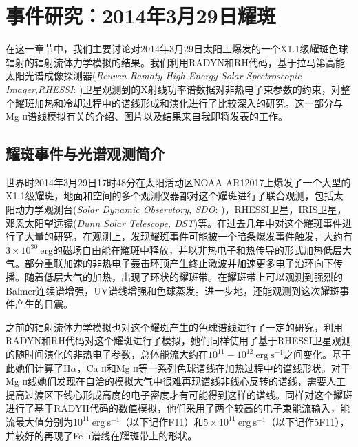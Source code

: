 
\chapter{事件研究：2014年3月29日耀斑}\label{chap:3}
在这一章节中，我们主要讨论对2014年3月29日太阳上爆发的一个X1.1级耀斑色球辐射的辐射流体力学模拟的结果。我们利用RADYN和RH代码，基于拉马第高能太阳光谱成像探测器(\textit{Reuven Ramaty High Energy Solar Spectroscopic Imager,RHESSI}: \cites{Lin2002})卫星观测到的X射线功率谱数据对非热电子束参数的约束，对整个耀斑加热和冷却过程中的谱线形成和演化进行了比较深入的研究。这一部分与Mg \textsc{ii}谱线模拟有关的介绍、图片以及结果来自我即将发表的工作\textcites{Zhu2019}。


\section{耀斑事件与光谱观测简介}\label{sec:3}
世界时2014年3月29日17时48分在太阳活动区NOAA AR12017上爆发了一个大型的X1.1级耀斑，地面和空间的多个观测仪器都对这个耀斑进行了联合观测，包括太阳动力学观测台(\textit{Solar Dynamic Observtory, SDO}: \cites{Lemen2012})，RHESSI卫星，IRIS卫星，邓恩太阳望远镜(\textit{Dunn Solar Telescope, DST})等。在过去几年中对这个耀斑事件进行了大量的研究，在观测上，发现耀斑事件可能被一个暗条爆发事件触发\parencites{Kleint2015,Woods2018}，大约有$3\times10^{30}\ \mathrm{erg}$的磁场自由能在耀斑中释放\parencites{Aschwanden2015}，并以非热电子和热传导的形式加热低层大气\parencites{Battaglia2015}。部分重联加速的非热电子轰击环顶产生终止激波\parencites{Polito2018}并加速更多电子沿环向下传播。随着低层大气的加热，出现了环状的耀斑带\parencites{LiuC2015}。在耀斑带上可以观测到强烈的Balmer连续谱增强\parencites{Heinzel2014}，UV谱线增强\parencites{Liu2015}和色球蒸发\parencites{Young2015,Li2015}。进一步地，还能观测到这次耀斑事件产生的日震\parencites{Judge2014}。

之前的辐射流体力学模拟也对这个耀斑产生的色球谱线进行了一定的研究，\textcites{Rubio2016}利用RADYN和RH代码对这个耀斑进行了模拟，她们同样使用了基于RHESSI卫星观测的随时间演化的非热电子参数，总体能流大约在$10^{11}-10^{12}\ \mathrm{erg\  s^{-1}}$之间变化。基于此她们计算了H$\alpha$，Ca \textsc{ii}和Mg \textsc{ii}等一系列色球谱线在加热过程中的谱线形状。对于Mg \textsc{ii}线她们发现在自洽的模拟大气中很难再现谱线非线心反转的谱线，需要人工提高过渡区下线心形成高度的电子密度才有可能得到这样的谱线。\textcites{Kowalski2017a}同样对这个耀斑进行了基于RADYH代码的数值模拟，他们采用了两个较高的电子束能流输入，能流最大值分别为$10^{11}\ \mathrm{erg\  s^{-1}}$（以下记作F11）和$5\times10^{11}\ \mathrm{erg\  s^{-1}}$（以下记作5F11），并较好的再现了Fe \textsc{ii}谱线在耀斑带上的形状。
